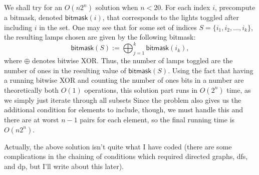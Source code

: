 \documentclass[a4paper, 12pt]{article}
\begin{document}
\begin{solution}
    We shall try for an \( O(n 2^n) \) solution when \( n < 20 \). For each index \( i \), precompute a bitmask, denoted \( \textsf{bitmask}(i) \), that corresponds to the lights toggled after including \( i \) in the set. One may see that for some set of indices \( S = \{ i_1, i_2, \ldots, i_k \} \), the resulting lamps chosen are given by the following bitmask:
    \[
        \textsf{bitmask}(S) := \bigoplus_{j = 1}^{k} \textsf{bitmask}(i_k)
    ,\]
    where \( \oplus \) denotes bitwise XOR. Thus, the number of lamps toggled are the number of ones in the resulting value of \( \textsf{bitmask}(S) \). Using the fact that having a running bitwise XOR and counting the number of ones bits in a number are theoretically both \( O(1) \) operations, this solution part runs in \( O(2^n) \) time, as we simply just iterate through all subsets Since the problem also gives us the additional condition for elements to include, though, we must handle this and there are at worst \( n - 1 \) pairs for each element, so the final running time is \( O(n 2^n) \).

    Actually, the above solution isn't quite what I have coded (there are some complications in the chaining of conditions which required directed graphs, dfs, and dp, but I'll write about this later).
\end{solution}
\end{document}
